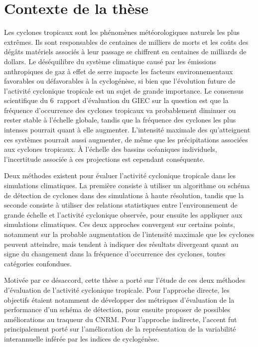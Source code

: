 \documentclass[../main.tex]{subfiles}
\begin{document}
\section*{Contexte de la thèse}

Les cyclones tropicaux sont les phénomènes météorologiques naturels les plus extrêmes. Ils sont responsables de centaines de milliers de morts et les coûts des dégâts matériels
associés à leur passage se chiffrent en centaines de milliards de dollars. Le déséquilibre du système climatique causé par les émissions anthropiques de gaz à
effet de serre impacte les facteurs environnementaux favorables ou défavorables à la cyclogénèse, si bien que l'évolution future de l'activité cyclonique
tropicale est un sujet de grande importance. Le consensus scientifique du 6\ieme\ rapport d'évaluation du GIEC sur la question est que la fréquence d'occurrence des cyclones tropicaux va probablement
diminuer ou rester stable à l'échelle globale, tandis que la fréquence des cyclones les plus intenses pourrait quant à elle augmenter. L'intensité maximale des
qu'atteignent ces systèmes pourrait aussi augmenter, de même que les précipitations associées aux cyclones tropicaux. À l'échelle des bassins océaniques
individuels, l'incertitude associée à ces projections est cependant conséquente.

Deux méthodes existent pour évaluer l'activité cyclonique tropicale dans les
simulations climatiques. La première consiste à utiliser un algorithme ou schéma de détection de cyclones dans des simulations à haute résolution, tandis que la
seconde consiste à utiliser des relations statistiques entre l'environnement de grande échelle et l'activité cyclonique observée, pour ensuite les appliquer aux
simulations climatiques. Ces deux approches convergent sur certains points, notamment sur la probable augmentation de l'intensité maximale que les cyclones
peuvent atteindre, mais tendent à indiquer des résultats divergeant quant au signe du changement dans la fréquence d'occurrence des cyclones, toutes catégories
confondues.

Motivée par ce désaccord, cette thèse a porté sur l'étude de ces deux méthodes d'évaluation de l'activité cyclonique tropicale. Pour l'approche directe, les
objectifs étaient notamment de développer des métriques d'évaluation de la performance d'un schéma de détection, pour ensuite proposer de possibles
améliorations au traqueur du CNRM. Pour l'approche indirecte, l'accent fut principalement porté sur l'amélioration de la représentation de la variabilité
interannuelle inférée par les indices de cyclogénèse.
\end{document}
